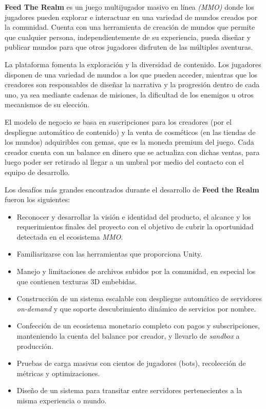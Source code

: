 \textbf{Feed The Realm} es un juego  multijugador masivo en línea \textit{(MMO)} donde los jugadores pueden 
explorar e interactuar en una variedad de mundos creados por la comunidad.
Cuenta con una herramienta de creación de mundos que permite que cualquier persona,
independientemente de su experiencia, pueda diseñar y publicar mundos para que otros jugadores disfruten de las múltiples aventuras.

\vspace{0.25cm}

La plataforma fomenta la exploración y la diversidad de contenido.
Los jugadores disponen de una variedad de mundos 
a los que pueden acceder, mientras que los creadores son responsables de diseñar la narrativa y la progresión dentro 
de cada uno, ya sea mediante cadenas de misiones, la dificultad de los enemigos u otros mecanismos de su elección.

El modelo de negocio se basa en suscripciones para los creadores (por el despliegue automático de contenido) y 
la venta de cosméticos (en las tiendas de los mundos) adquiribles con gemas, que es la moneda premium del juego.
Cada creador cuenta con un balance en dinero que se actualiza con dichas ventas, para luego poder ser
retirado al llegar a un umbral por medio del contacto con el equipo de desarrollo.

\vspace{0.25cm}

Los desafíos más grandes encontrados durante el desarrollo de \textbf{Feed the Realm} fueron los siguientes:

\begin{itemize}
    \item Reconocer y desarrollar la visión e identidad del producto, el alcance y los requerimientos finales del proyecto
    con el objetivo de cubrir la oportunidad detectada en el ecosistema \textit{MMO}.
    \item Familiarizarse con las herramientas que proporciona Unity.
    \item Manejo y limitaciones de archivos subidos por la comunidad, en especial los que contienen texturas 3D embebidas.
    \item Construcción de un sistema escalable con despliegue automático de servidores \textit{on-demand}
    y que soporte descubrimiento dinámico de servicios por nombre.
    \item Confección de un ecosistema monetario completo con pagos y subscripciones, manteniendo la cuenta
    del balance por creador, y llevarlo de \textit{sandbox} a producción.
    \item Pruebas de carga masivas con cientos de jugadores (bots), recolección de métricas y optimizaciones.
    \item Diseño de un sistema para transitar entre servidores pertenecientes a la misma experiencia o mundo.
\end{itemize}
